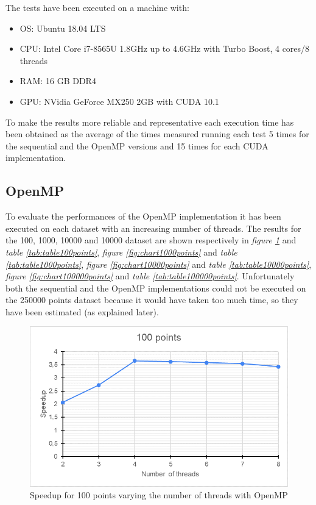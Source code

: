 \documentclass[10pt,twocolumn,letterpaper]{article}
\begin{document}
The tests have been executed on a machine with:
\begin{itemize}
\item OS: Ubuntu 18.04 LTS
\item CPU: Intel Core i7-8565U 1.8GHz up to 4.6GHz with Turbo Boost, 4 cores/8 threads
\item RAM: 16 GB DDR4
\item GPU: NVidia GeForce MX250 2GB with CUDA 10.1
\end{itemize}

To make the results more reliable and representative each execution time has been obtained as the average of the times measured running each test 5 times for the sequential and the OpenMP versions and 15 times for each CUDA implementation. 
\subsection{OpenMP}
To evaluate the performances of the OpenMP implementation it has been executed on each dataset with an increasing number of threads. The results for the 100, 1000, 10000 and 10000 dataset are shown respectively in \emph{figure \ref{fig:chart100points}} and \emph{table \ref{tab:table100points}}, \emph{figure \ref{fig:chart1000points}} and \emph{table \ref{tab:table1000points}}, \emph{figure \ref{fig:chart10000points}} and \emph{table \ref{tab:table10000points}}, \emph{figure \ref{fig:chart100000points}} and \emph{table \ref{tab:table100000points}}. Unfortunately both the sequential and the OpenMP implementations could not be executed on the 250000 points dataset because it would have taken too much time, so they have been estimated (as explained later).

\begin{figure}
\includegraphics[width=0.99\linewidth]{img/chart_100_points}
\caption{Speedup for 100 points varying the number of threads with OpenMP}
\label{fig:chart100points}
\end{figure}
\end{document}
